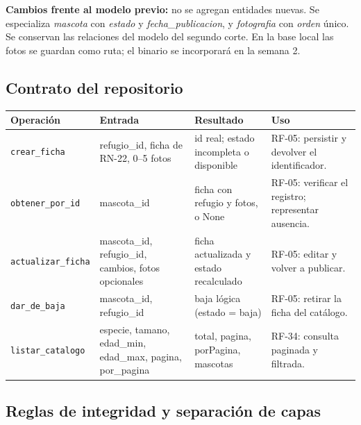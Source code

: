 \documentclass[11pt,a4paper]{article}
\newcommand{\code}[1]{\texttt{#1}}
\newcommand{\thead}[1]{\textbf{#1}}
\begin{document}
{\footnotesize
\textbf{Cambios frente al modelo previo:} no se agregan entidades nuevas. Se especializa
\emph{mascota} con \emph{estado} y \emph{fecha\_publicacion}, y \emph{fotografia} con
\emph{orden} único. Se conservan las relaciones del modelo del segundo corte. En la base local
las fotos se guardan como ruta; el binario se incorporará en la semana 2.\par}

\subsection{Contrato del repositorio}

{\footnotesize
\begin{tabularx}{\linewidth}{@{}V{1.0}V{0.95}V{1.15}V{0.9}@{}}
\toprule

\thead{Operación} & \thead{Entrada} & \thead{Resultado} & \thead{Uso} \\ \midrule

\code{crear\_ficha} & refugio\_id, ficha de RN-22, 0--5 fotos & id real; estado incompleta o disponible & RF-05: persistir y devolver el identificador. \\
\code{obtener\_por\_id} & mascota\_id & ficha con refugio y fotos, o None & RF-05: verificar el registro; representar ausencia. \\
\code{actualizar\_ficha} & mascota\_id, refugio\_id, cambios, fotos opcionales & ficha actualizada y estado recalculado & RF-05: editar y volver a publicar. \\
\code{dar\_de\_baja} & mascota\_id, refugio\_id & baja lógica (estado = baja) & RF-05: retirar la ficha del catálogo. \\
\code{listar\_catalogo} & especie, tamano, edad\_min, edad\_max, pagina, por\_pagina & total, pagina, porPagina, mascotas & RF-34: consulta paginada y filtrada. \\
\bottomrule
\end{tabularx}
}

\subsection{Reglas de integridad y separación de capas}
\end{document}
